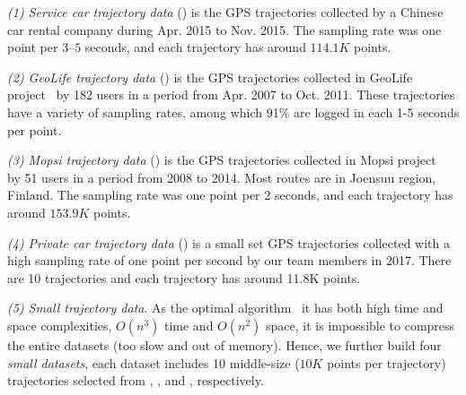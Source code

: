 
\vspace{0.5ex}
\ni \emph{(1) Service car trajectory data} (\sercar) is the GPS trajectories collected by a Chinese car rental company during Apr. 2015 to Nov. 2015. The sampling rate was one point per $3$--$5$ seconds, and each trajectory has around $114.1K$ points.

\vspace{0.5ex}
\ni \emph{(2) GeoLife trajectory data} (\geolife) is the GPS trajectories collected in GeoLife project~\cite{Web:Geolife} by 182 users in a period from Apr. 2007 to Oct. 2011. These trajectories have a variety of sampling rates, among which 91\% are logged in each 1-5 seconds per point. %

\vspace{0.5ex}
\ni \emph{(3) Mopsi trajectory data} (\mopsi) is the GPS trajectories collected in Mopsi project~\cite{Web:Mopsi} by 51 users in a period from 2008 to 2014. Most routes are in Joensuu region, Finland.
The sampling rate was one point per $2$ seconds, and each trajectory has around $153.9K$ points.

\vspace{0.5ex}
\ni \emph{(4) Private car trajectory data} (\pricar) is a small set GPS trajectories collected with a high sampling rate of one point per second by our team members in 2017. There are 10 trajectories and each trajectory has around 11.8K points.


\vspace{0.5ex}
\ni \emph{(5) Small trajectory data}.
As the optimal \lsa algorithm~\cite{Imai:Optimal} it has both high time and space complexities, \ie $O(n^3)$ time and $O(n^2)$ space, it is impossible to compress the entire datasets (too slow and out of memory). Hence, we further build four \textit{small datasets}, each dataset includes 10 middle-size ($10K$ points per trajectory) trajectories selected from \sercar, \geolife, \mopsi and \pricar, respectively.

